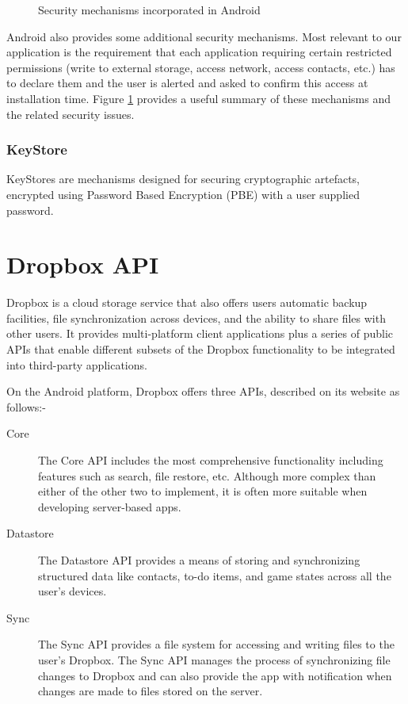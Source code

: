 \begin{figure}[h!]
                                                                                                                                                                                                                                                                                                                                                                                                                                           
\caption[Security table]{Security mechanisms incorporated in Android \citep{shabtai2010google}}\label{fg:overview_pyramid}
        \label{fig:table}
\end{figure}

Android also provides some additional security mechanisms. Most relevant to our application is the requirement that each application requiring certain restricted permissions (write to external storage, access network, access contacts, etc.) has to declare them and the user is alerted and asked to confirm this access at installation time.  Figure \ref{fig:table} provides a useful summary of these mechanisms and the related security issues.

\subsubsection*{KeyStore}

KeyStores are mechanisms designed for securing cryptographic artefacts, encrypted using Password Based Encryption (PBE) with a user supplied password.  



\section{Dropbox API}
\label{sec:dropbox}
Dropbox is a cloud storage service that also offers users  automatic backup facilities, file synchronization across devices, and the ability to share files with other users.  It provides multi-platform client applications plus a series of public APIs that enable different subsets of the Dropbox functionality to be integrated into third-party applications.  

On the Android platform, Dropbox offers three APIs, described on its website as follows:-
\begin{description}
	\item[Core]The Core API includes the most comprehensive functionality including features such as search, file restore, etc. Although more complex than either of the other two to implement, it is often more suitable when developing server-based apps.
	\item[Datastore]The Datastore API provides a means of storing and synchronizing structured data like contacts, to-do items, and game states across  all the user's devices.
	\item[Sync]The Sync API provides a file system for accessing and writing files to the user's Dropbox.  The Sync API manages the process of synchronizing file changes to Dropbox and can also provide the app with notification when changes are made to files stored on the server.
\end{description}

